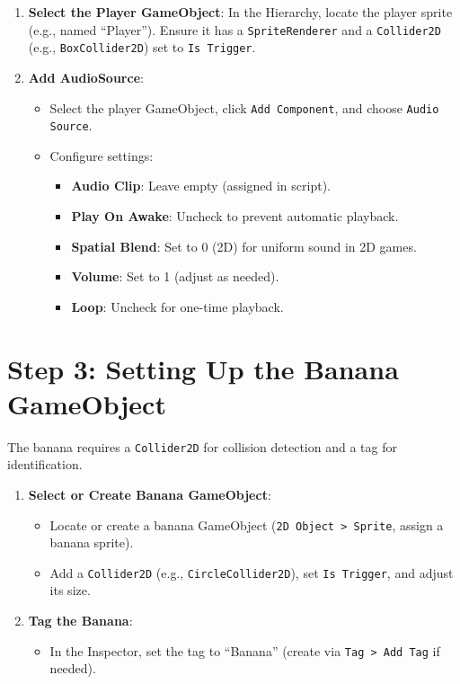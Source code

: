 \documentclass[a4paper,12pt]{article}
\begin{document}
	\begin{enumerate}[label=\arabic*.]
		\item \textbf{Select the Player GameObject}: In the Hierarchy, locate the player sprite (e.g., named ``Player''). Ensure it has a \texttt{SpriteRenderer} and a \texttt{Collider2D} (e.g., \texttt{BoxCollider2D}) set to \texttt{Is Trigger}.
		\item \textbf{Add AudioSource}:
		\begin{itemize}
			\item Select the player GameObject, click \texttt{Add Component}, and choose \texttt{Audio Source}.
			\item Configure settings:
			\begin{itemize}
				\item \textbf{Audio Clip}: Leave empty (assigned in script).
				\item \textbf{Play On Awake}: Uncheck to prevent automatic playback.
				\item \textbf{Spatial Blend}: Set to 0 (2D) for uniform sound in 2D games.
				\item \textbf{Volume}: Set to 1 (adjust as needed).
				\item \textbf{Loop}: Uncheck for one-time playback.
			\end{itemize}
		\end{itemize}
	\end{enumerate}
	
	\section{Step 3: Setting Up the Banana GameObject}
	The banana requires a \texttt{Collider2D} for collision detection and a tag for identification.
	
	\begin{enumerate}[label=\arabic*.]
		\item \textbf{Select or Create Banana GameObject}:
		\begin{itemize}
			\item Locate or create a banana GameObject (\texttt{2D Object > Sprite}, assign a banana sprite).
			\item Add a \texttt{Collider2D} (e.g., \texttt{CircleCollider2D}), set \texttt{Is Trigger}, and adjust its size.
		\end{itemize}
		\item \textbf{Tag the Banana}:
		\begin{itemize}
			\item In the Inspector, set the tag to ``Banana'' (create via \texttt{Tag > Add Tag} if needed).
		\end{itemize}
	\end{enumerate}
	\newpage
\end{document}
